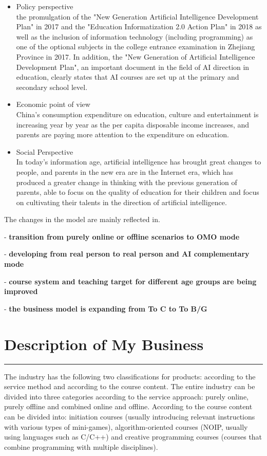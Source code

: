 \documentclass[12pt]{extarticle}
\numberwithin{figure}{section}
\begin{document}
\begin{itemize}
    \setlength{\itemsep}{0pt}
          \setlength{\parsep}{0pt}
          \setlength{\parskip}{0pt}
    \item {\normalsize Policy perspective}\\
          the promulgation of the "New Generation Artificial Intelligence Development Plan" in 2017 and the "Education Informatization 2.0 Action Plan" in 2018 as well as the inclusion of information technology (including programming) as one of the optional subjects in the college entrance examination in Zhejiang Province in 2017. In addition, the "New Generation of Artificial Intelligence Development Plan", an important document in the field of AI direction in education, clearly states that AI courses are set up at the primary and secondary school level.
    \item {\normalsize Economic point of view}\\
          China's consumption expenditure on education, culture and entertainment is increasing year by year as the per capita disposable income increases, and parents are paying more attention to the expenditure on education.
    \item {\normalsize Social Perspective}\\
          In today's information age, artificial intelligence has brought great changes to people, and parents in the new era are in the Internet era, which has produced a greater change in thinking with the previous generation of parents, able to focus on the quality of education for their children and focus on cultivating their talents in the direction of artificial intelligence.
\end{itemize}

The changes in the model are mainly reflected in.

- \textbf{transition from purely online or offline scenarios to OMO mode}

- \textbf{developing from real person to real person and AI complementary mode}

- \textbf{course system and teaching target for different age groups are being improved}

- \textbf{the business model is expanding from To C to To B/G}

\section{Description of My Business}
\vspace{-0.1cm}
\hrule
\vspace{0.2cm}
The industry has the following two classifications for products: according to the service method and according to the course content. The entire industry can be divided into three categories according to the service approach: purely online, purely offline and combined online and offline. According to the course content can be divided into: initiation courses (usually introducing relevant instructions with various types of mini-games), algorithm-oriented courses (NOIP, usually using languages such as C/C++) and creative programming courses (courses that combine programming with multiple disciplines).
\end{document}
